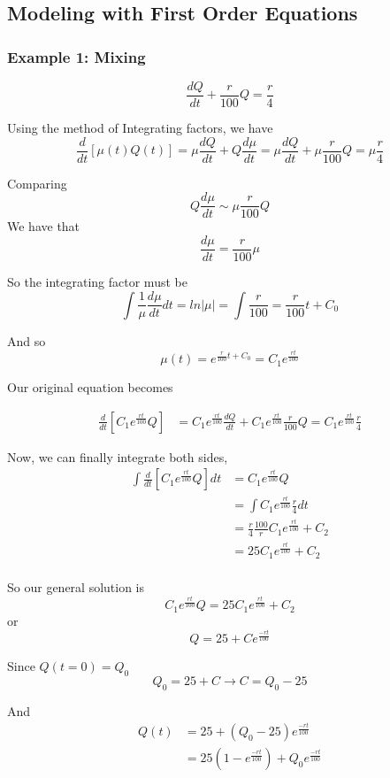 \subsection{Modeling with First Order Equations}


\subsubsection{Example 1: Mixing}
$$
\frac{d Q}{dt} + \frac{r}{100}Q = \frac{r}{4}
$$

Using the method of Integrating factors, we have
$$
\frac{d}{dt}\left[\mu(t)Q(t)\right] = \mu\frac{dQ}{dt} + Q \frac{d\mu}{dt}
= \mu \frac{d Q}{dt} + \mu \frac{r}{100}Q = \mu \frac{r}{4}
$$

Comparing
$$
Q \frac{d\mu}{dt} \sim \mu \frac{r}{100}Q
$$
We have that
$$
\frac{d\mu}{dt} = \frac{r}{100} \mu
$$

So the integrating factor must be
$$
\int \frac{1}{\mu} \frac{d\mu}{dt} dt = ln |\mu| 
= \int \frac{r}{100} = \frac{r}{100}t + C_0
$$

And so
$$
\mu(t) = e^{\frac{r}{100}t + C_0} = C_1e^{\frac{rt}{100}}
$$

Our original equation becomes

\begin{align*}
    \frac{d}{dt} \left[ C_1e^{\frac{rt}{100}} Q \right]  &=   
    C_1e^{\frac{rt}{100}} \frac{d Q}{dt} + C_1e^{\frac{rt}{100}} \frac{r}{100}Q = C_1e^{\frac{rt}{100}} \frac{r}{4}
\end{align*}

Now, we can finally integrate both sides,
\begin{align*}
    \int \frac{d}{dt} \left[ C_1e^{\frac{rt}{100}} Q \right] dt  &=  C_1e^{\frac{rt}{100}} Q     \\
    &= \int C_1e^{\frac{rt}{100}} \frac{r}{4} dt    \\
    &= \frac{r}{4} \frac{100}{r} C_1e^{\frac{rt}{100}} + C_2 \\
    &= 25 C_1e^{\frac{rt}{100}} + C_2 \\
\end{align*}

So our general solution is
$$
C_1e^{\frac{rt}{100}} Q = 25 C_1e^{\frac{rt}{100}} + C_2
$$
or
$$
Q = 25 + C e^{\frac{-rt}{100}}
$$

Since $Q(t=0) = Q_0$
$$
Q_0 = 25 + C \rightarrow C = Q_0 - 25
$$

And
\begin{align*}
    Q(t) &= 25 + (Q_0 - 25) e^{\frac{-rt}{100}} \\
    &= 25(1 - e^{\frac{-rt}{100}}) + Q_0 e^{\frac{-rt}{100}}
\end{align*}

